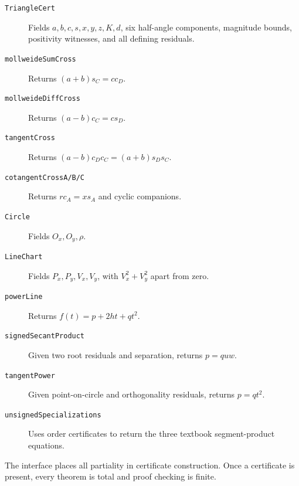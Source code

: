 \documentclass[11pt,letterpaper]{article}
\theoremstyle{definition}
\theoremstyle{remark}
\newcommand{\code}[1]{\texttt{#1}}
\begin{document}
\begin{description}
\item[\code{TriangleCert}] Fields \(a,b,c,s,x,y,z,K,d\), six half-angle
components, magnitude bounds, positivity witnesses, and all defining residuals.
\item[\code{mollweideSumCross}] Returns
\((a+b)s_C=cc_D\).
\item[\code{mollweideDiffCross}] Returns
\((a-b)c_C=cs_D\).
\item[\code{tangentCross}] Returns
\((a-b)c_Dc_C=(a+b)s_Ds_C\).
\item[\code{cotangentCrossA/B/C}] Returns
\(rc_A=xs_A\) and cyclic companions.
\item[\code{Circle}] Fields \(O_x,O_y,\rho\).
\item[\code{LineChart}] Fields \(P_x,P_y,V_x,V_y\), with
\(V_x^2+V_y^2\) apart from zero.
\item[\code{powerLine}] Returns \(f(t)=p+2ht+qt^2\).
\item[\code{signedSecantProduct}] Given two root residuals and separation,
returns \(p=quw\).
\item[\code{tangentPower}] Given point-on-circle and orthogonality residuals,
returns \(p=qt^2\).
\item[\code{unsignedSpecializations}] Uses order certificates to return the
three textbook segment-product equations.
\end{description}

The interface places all partiality in certificate construction.  Once a
certificate is present, every theorem is total and proof checking is finite.
\end{document}

